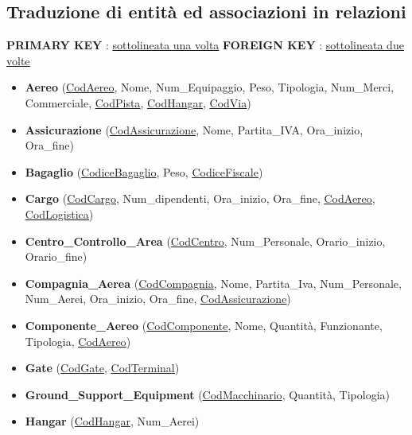 
\newpage

\subsection{Traduzione di entità ed associazioni in relazioni}

\centering
\textsf{\small \textbf{PRIMARY KEY} : \underline{sottolineata una volta}}
\textsf{\small \textbf{FOREIGN KEY} : \underline{\underline{sottolineata due volte}}}\\


\begin{itemize}
	\item \textbf{\small Aereo} \textsf{\small (\underline{CodAereo}, Nome, Num\_Equipaggio, Peso, Tipologia, Num\_Merci, Commerciale, \underline{\underline{CodPista}}, \underline{\underline{CodHangar}}, \underline{\underline{CodVia}})}
	\item \textbf{\small Assicurazione} \textsf{\small (\underline{CodAssicurazione}, Nome, Partita\_IVA, Ora\_inizio, Ora\_fine)}
	\item \textbf{\small Bagaglio} \textsf{\small (\underline{CodiceBagaglio}, Peso, \underline{\underline{CodiceFiscale}})}
	\item \textbf{\small Cargo} \textsf{\small (\underline{CodCargo}, Num\_dipendenti, Ora\_inizio, Ora\_fine, \underline{\underline{CodAereo}}, \underline{\underline{CodLogistica}})}
	\item \textbf{\small Centro\_Controllo\_Area} \textsf{\small (\underline{CodCentro}, Num\_Personale, Orario\_inizio, Orario\_fine)}
	\item \textbf{\small Compagnia\_Aerea} \textsf{\small (\underline{CodCompagnia}, Nome, Partita\_Iva, Num\_Personale, Num\_Aerei, Ora\_inizio, Ora\_fine, \underline{\underline{CodAssicurazione}})}
	\item \textbf{\small Componente\_Aereo} \textsf{\small (\underline{CodComponente}, Nome, Quantità, Funzionante, Tipologia, \underline{\underline{CodAereo}})}
	\item \textbf{\small Gate} \textsf{\small (\underline{CodGate}, \underline{\underline{CodTerminal}})}
	\item \textbf{\small Ground\_Support\_Equipment} \textsf{\small (\underline{CodMacchinario}, Quantità, Tipologia)}
	\item \textbf{\small Hangar} \textsf{\small (\underline{CodHangar}, Num\_Aerei)}

\end{itemize}
